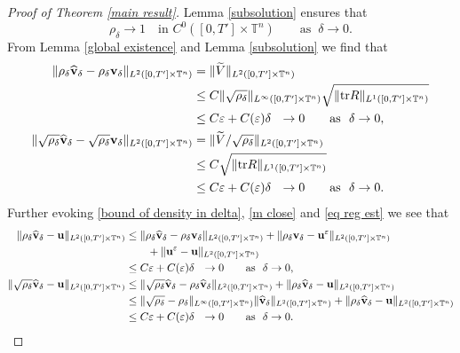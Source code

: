 \documentclass[12pt,reqno]{amsart}
\theoremstyle{definition}
\theoremstyle{remark}
\numberwithin{equation}{section}
\renewcommand{\u}{{\bf u}}
\newcommand{\trace}{\mathrm{tr}}
\renewcommand{\v}{{\bf v}}
\newcommand{\eps}{{\varepsilon}}
\begin{document}
\begin{proof}[Proof of Theorem \ref{main result}]
Lemma \ref{subsolution} ensures that
\[
\rho_{\delta}\to1 \quad \text{in } C^0([0,T'] \times\mathbb{T}^n) \qquad \text{as } \ \delta \to 0.
\]
From Lemma \ref{global existence} and Lemma \ref{subsolution} we find that 
\begin{align*}
\| \rho_\delta \widehat{\v}_{\delta} - \rho_\delta \v_{\delta} \|_{L^{2}([0,T'] \times \mathbb{T}^n)} & = \| \widetilde{V} \|_{L^{2}([0,T'] \times \mathbb{T}^n)} \\
& \le C \| \sqrt{\rho_\delta} \|_{L^\infty([0,T'] \times \mathbb{T}^n)} \sqrt{\| \trace R \|_{L^{1}([0,T'] \times \mathbb{T}^n)}} \\
& \le C \eps + C(\eps) \delta \ \ \to 0 \qquad \text{as } \ \delta \to 0, \\
\| \sqrt{\rho_\delta} \widehat{\v}_{\delta} - \sqrt{\rho_\delta} \v_{\delta} \|_{L^{2}([0,T'] \times \mathbb{T}^n)} & = \| \widetilde{V}/ \sqrt{\rho_\delta} \|_{L^{2}([0,T'] \times \mathbb{T}^n)} \\
& \le C \sqrt{\| \trace R \|_{L^{1}([0,T'] \times \mathbb{T}^n)}} \\
&  \le C \eps + C(\eps) \delta \ \ \to 0 \qquad \text{as } \ \delta \to 0.
\end{align*}
Further evoking \eqref{bound of density in delta}, \eqref{m close} and \eqref{eq reg est} we see that 
\begin{align*}
\| \rho_\delta \widehat{\v}_{\delta} - \u \|_{L^{2}([0,T'] \times \mathbb{T}^n)} & \le \| \rho_\delta \widehat{\v}_{\delta} - \rho_\delta \v_{\delta} \|_{L^{2}([0,T'] \times \mathbb{T}^n)} + \| \rho_\delta \v_{\delta} - \u^\eps \|_{L^{2}([0,T'] \times \mathbb{T}^n)} \\
&\qquad + \| \u^\eps - \u \|_{L^{2}([0,T'] \times \mathbb{T}^n)} \\
& \le C \eps + C(\eps) \delta \ \ \to 0 \qquad \text{as } \ \delta \to 0,\\
\| \sqrt{\rho_\delta} \widehat{\v}_{\delta} - \u \|_{L^{2}([0,T'] \times \mathbb{T}^n)} & \le \| \sqrt{\rho_\delta} \widehat{\v}_{\delta} - \rho_\delta \widehat{\v}_{\delta} \|_{L^{2}([0,T'] \times \mathbb{T}^n)} + \| \rho_\delta \widehat{\v}_{\delta} - \u\|_{L^{2}([0,T'] \times \mathbb{T}^n)}\\
& \le \| \sqrt{\rho_\delta} - \rho_\delta \|_{L^{\infty}([0,T'] \times \mathbb{T}^n)} \| \widehat{\v}_\delta \|_{L^{2}([0,T'] \times \mathbb{T}^n)} + \| \rho_\delta \widehat{\v}_{\delta} - \u\|_{L^{2}([0,T'] \times \mathbb{T}^n)}\\
& \le C \eps + C(\eps) \delta \ \ \to 0 \qquad \text{as } \ \delta \to 0.
\end{align*}


\end{proof}
\end{document}

